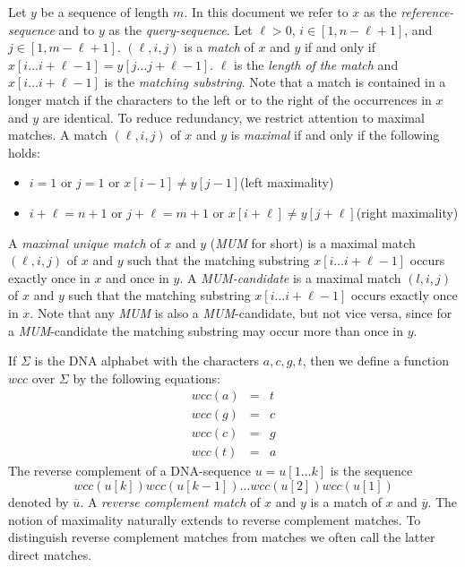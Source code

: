 \documentclass[12pt]{article}
\newcommand{\MUM}[0]{\textit{MUM}\xspace}
\newcommand{\Subs}[3]{#1[#2\ldots#3]}
\newcommand{\Match}[3]{(#3,#1,#2)}
\begin{document}
Let \(y\) be a sequence of length \(m\). In this document we refer to
\(x\) as the \emph{reference-sequence} and to \(y\) as the 
\emph{query-sequence}.
Let \(\ell>0\), \(i\in[1,n-\ell+1]\), and \(j\in[1,m-\ell+1]\).
\(\Match{i}{j}{\ell}\) is a \emph{match} of \(x\) and \(y\) if and only if
\(\Subs{x}{i}{i+\ell-1}=\Subs{y}{j}{j+\ell-1}\).
\(\ell\) is the \emph{length of the match} and \(\Subs{x}{i}{i+\ell-1}\)
is the \emph{matching substring}. Note that a match is contained in a 
longer match if the characters to the left or to the right of the 
occurrences in \(x\) and \(y\) are identical. To reduce redundancy, 
we restrict attention to maximal matches.
A match \(\Match{i}{j}{\ell}\) of \(x\) and \(y\) is \emph{maximal} if 
and only if the following holds:
\begin{itemize}
\item
\(i=1\) or \(j=1\) or \(x[i-1]\neq y[j-1]\)\hfill(left maximality)
\item
\(i+\ell=n+1\) or \(j+\ell=m+1\) or \(x[i+\ell]\neq 
y[j+\ell]\)\hfill(right maximality)
\end{itemize}
A \emph{maximal unique match} of \(x\) and \(y\) (\MUM for short) is a 
maximal match \(\Match{i}{j}{\ell}\) of \(x\) and \(y\) such that the 
matching substring \(\Subs{x}{i}{i+\ell-1}\)
occurs exactly once in \(x\) and once in \(y\). A \emph{\MUM-candidate} 
is a maximal match \(\Match{i}{j}{l}\) of \(x\) and \(y\) 
such that the matching substring 
\(\Subs{x}{i}{i+\ell-1}\) occurs exactly once in \(x\). Note that 
any \MUM is also a \MUM-candidate, but not vice versa, since for a
\MUM-candidate the matching substring may occur more than once in \(y\).

If \(\Sigma\) is the DNA alphabet with the characters \(a,c,g,t\), then we 
define a function \(wcc\) over \(\Sigma\) by the following equations:
\begin{eqnarray*}
wcc(a)&=&t\\
wcc(g)&=&c\\
wcc(c)&=&g\\
wcc(t)&=&a
\end{eqnarray*}
The reverse complement of 
a DNA-sequence \(u=\Subs{u}{1}{k}\) is the sequence
\[wcc(u[k])wcc(u[k-1])\ldots wcc(u[2])wcc(u[1])\]
denoted by \(\overline{u}\).
A \emph{reverse complement match} of \(x\) and \(y\) is a 
match of \(x\) and \(\overline{y}\). The notion of maximality 
naturally extends to reverse complement matches. To distinguish reverse
complement matches from matches we often call the latter direct matches.
\end{document}
